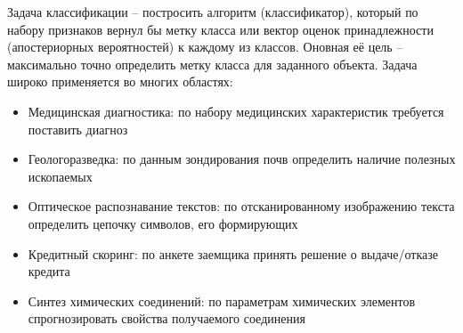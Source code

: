 \documentclass[times,specification,annotation]{itmo-student-thesis}
\begin{document}
	
	
	
	
	
	
	
	\tableofcontents
	
	\startprefacepage
	Задача классификации -- постросить алгоритм (классификатор), который по набору признаков вернул бы метку класса или вектор оценок принадлежности (апостериорных вероятностей) к каждому из классов. Оновная её цель -- максимально точно определить метку класса для заданного объекта. Задача широко применяется во многих областях:
	\begin{itemize}
		\item Медицинская диагностика: по набору медицинских характеристик требуется поставить диагноз
		\item Геологоразведка: по данным зондирования почв определить наличие полезных ископаемых
		\item Оптическое распознавание текстов: по отсканированному изображению текста определить цепочку символов, его формирующих
		\item Кредитный скоринг: по анкете заемщика принять решение о выдаче/отказе кредита
		\item Синтез химических соединений: по параметрам химических элементов спрогнозировать свойства получаемого соединения
	\end{itemize}
	
\end{document}
